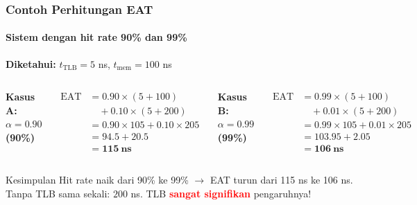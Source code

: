 \documentclass[t,aspectratio=169,xcolor=dvipsnames]{beamer}
\newcommand{\tem}[1]{\textbf{\textcolor{red}{#1}}}
\begin{document}
\begin{frame}
    \frametitle{Contoh Perhitungan EAT}
    \framesubtitle{Sistem dengan hit rate 90\% dan 99\%}
    \small

    \textbf{Diketahui:} $t_{\text{TLB}} = 5$ ns, $t_{\text{mem}} = 100$ ns

    \vspace{0.3cm}
    \begin{columns}[T]
        \textbf{Kasus A: $\alpha = 0.90$ (90\%)}

        \vspace{0.1cm}
        \begin{align*}
            \text{EAT} &= 0.90 \times (5 + 100) \\
                       &\quad + 0.10 \times (5 + 200) \\
                       &= 0.90 \times 105 + 0.10 \times 205 \\
                       &= 94.5 + 20.5 \\
                       &= \mathbf{115\ ns}
        \end{align*}

        \textbf{Kasus B: $\alpha = 0.99$ (99\%)}

        \vspace{0.1cm}
        \begin{align*}
            \text{EAT} &= 0.99 \times (5 + 100) \\
                       &\quad + 0.01 \times (5 + 200) \\
                       &= 0.99 \times 105 + 0.01 \times 205 \\
                       &= 103.95 + 2.05 \\
                       &= \mathbf{106\ ns}
        \end{align*}
    \end{columns}

    \vspace{0.2cm}
    \begin{exampleblock}{Kesimpulan}
        Hit rate naik dari 90\% ke 99\% $\rightarrow$ EAT turun dari 115 ns ke 106 ns.\\
        Tanpa TLB sama sekali: $200$ ns. TLB \tem{sangat signifikan} pengaruhnya!
    \end{exampleblock}
\end{frame}
\end{document}
